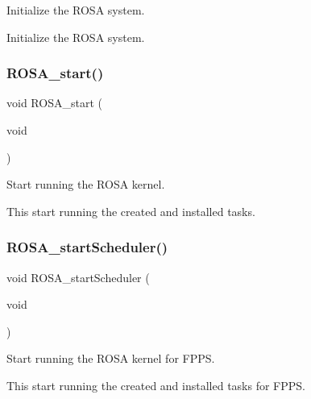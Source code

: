 Initialize the R\+O\+SA system. 

Initialize the R\+O\+SA system. \mbox{\label{group__rosa__kernel__sm_ga299c2721dc32b54f2acb881cf98bc13d}} 
\subsubsection{\texorpdfstring{R\+O\+S\+A\+\_\+start()}{ROSA\_start()}}
{\footnotesize\ttfamily void R\+O\+S\+A\+\_\+start (\begin{DoxyParamCaption}\item[{void}]{ }\end{DoxyParamCaption})}



Start running the R\+O\+SA kernel. 

This start running the created and installed tasks. \mbox{\label{group__rosa__kernel__sm_gaa7bf5f9ee0c2f711b8adeec7c816f44a}} 
\subsubsection{\texorpdfstring{R\+O\+S\+A\+\_\+start\+Scheduler()}{ROSA\_startScheduler()}}
{\footnotesize\ttfamily void R\+O\+S\+A\+\_\+start\+Scheduler (\begin{DoxyParamCaption}\item[{void}]{ }\end{DoxyParamCaption})}



Start running the R\+O\+SA kernel for F\+P\+PS. 

This start running the created and installed tasks for F\+P\+PS. 